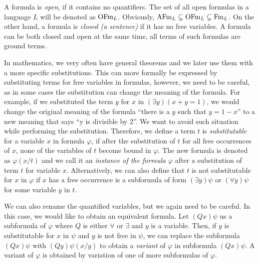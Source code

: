 A formula is \emph{open}, if it contains no quantifiers. The set of all open formulas in a language $L$ will be denoted as $\operatorname{OFm}_L$. Obviously, $\operatorname{AFm}_L \subsetneq \operatorname{OFm}_L \subsetneq \operatorname{Fm}_L$. On the other hand, a formula is \emph{closed (a sentence)} if it has no free variables. A formula can be both closed and open at the same time, all terms of such formulas are ground terms.

In mathematics, we very often have general theorems and we later use them with a more specific substitutions. This can more formally be expressed by substituting terms for free variables in formulas, however, we need to be careful, as in some cases the substitution can change the meaning of the formula. For example, if we substituted the term $y$ for $x$ in $(\exists y) (x+y=1)$, we would change the original meaning of the formula ``there is a $y$ such that $y = 1-x$'' to a new meaning that says ``y is divisible by 2''. We want to avoid such situation while performing the substitution. Therefore, we define a term $t$ is \emph{substitutable} for a variable $x$ in formula $\varphi$, if after the substitution of $t$ for all free occurrences of $x$, none of the variables of $t$ become bound in $\varphi$. The new formula is denoted as $\varphi(x/t)$ and we call it an \emph{instance of the formula $\varphi$} after a substitution of term $t$ for variable $x$. Alternatively, we can also define that $t$ is not substitutable for $x$ in $\varphi$ if $x$ has a free occurrence is a subformula of form $(\exists y)\psi$ or $(\forall y) \psi$ for some variable $y$ in $t$.

We can also rename the quantified variables, but we again need to be careful. In this case, we would like to obtain an equivalent formula. Let $(Qx)\psi$ us a subformula of $\varphi$ where $Q$ is either $\forall$ or $\exists$ and $y$ is a variable. Then, if $y$ is substitutable for $x$ in $\psi$ and $y$ is not free in $\psi$, we can replace the subformula $(Qx)\psi$ with $(Qy)\psi(x/y)$ to obtain a \emph{variant} of $\varphi$ in subformula $(Qx)\psi$. A variant of $\varphi$ is obtained by variation of one of more subformulas of $\varphi$.


